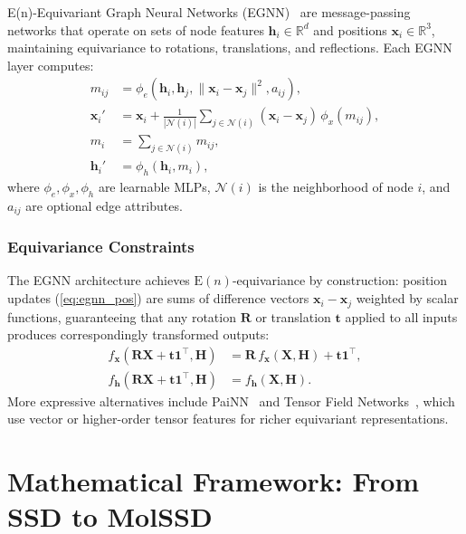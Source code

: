 \documentclass[12pt,a4paper]{article}
\providecommand{\R}{}
\renewcommand{\R}{\mathbb{R}}
\newcommand{\bx}{\bm{x}}
\newcommand{\bh}{\bm{h}}
\newcommand{\cN}{\mathcal{N}}
\begin{document}
E(n)-Equivariant Graph Neural Networks (EGNN)~\cite{satorras2021egnn} are message-passing networks that operate on sets of node features $\bh_i \in \R^d$ and positions $\bx_i \in \R^3$, maintaining equivariance to rotations, translations, and reflections. Each EGNN layer computes:
\begin{align}
    m_{ij} &= \phi_e(\bh_i, \bh_j, \|\bx_i - \bx_j\|^2, a_{ij}), \label{eq:egnn_message} \\
    \bx_i' &= \bx_i + \frac{1}{|\cN(i)|}\sum_{j \in \cN(i)} (\bx_i - \bx_j)\, \phi_x(m_{ij}), \label{eq:egnn_pos} \\
    m_i &= \sum_{j \in \cN(i)} m_{ij}, \label{eq:egnn_agg} \\
    \bh_i' &= \phi_h(\bh_i, m_i), \label{eq:egnn_feat}
\end{align}
where $\phi_e, \phi_x, \phi_h$ are learnable MLPs, $\cN(i)$ is the neighborhood of node $i$, and $a_{ij}$ are optional edge attributes.

\subsubsection{Equivariance Constraints}

The EGNN architecture achieves $\mathrm{E}(n)$-equivariance by construction: position updates (\cref{eq:egnn_pos}) are sums of difference vectors $\bx_i - \bx_j$ weighted by scalar functions, guaranteeing that any rotation $\bm{R}$ or translation $\bm{t}$ applied to all inputs produces correspondingly transformed outputs:
\begin{align}
    f_{\bx}(\bm{R}\bm{X} + \bm{t}\mathbf{1}^\top, \bm{H}) &= \bm{R}\, f_{\bx}(\bm{X}, \bm{H}) + \bm{t}\mathbf{1}^\top, \label{eq:equi_pos} \\
    f_{\bh}(\bm{R}\bm{X} + \bm{t}\mathbf{1}^\top, \bm{H}) &= f_{\bh}(\bm{X}, \bm{H}). \label{eq:equi_feat}
\end{align}
More expressive alternatives include PaiNN~\cite{schutt2021equivariant} and Tensor Field Networks~\cite{thomas2018tensor}, which use vector or higher-order tensor features for richer equivariant representations.

\section{Mathematical Framework: From SSD to MolSSD}\label{sec:framework}
\end{document}
